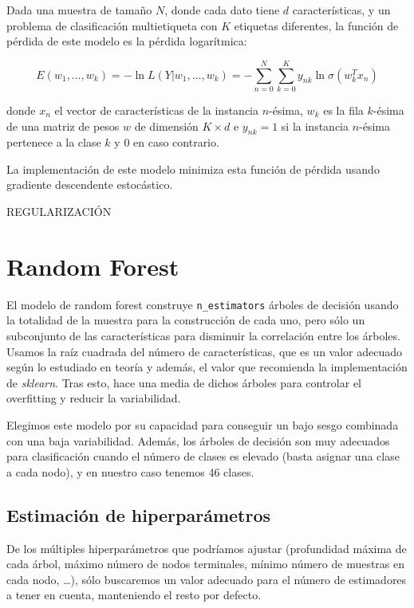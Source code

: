 \documentclass[a4]{article}
\begin{document}
Dada una muestra de tamaño $N$, donde cada dato tiene $d$ características, y un problema de clasificación multietiqueta con $K$ etiquetas diferentes, la función de pérdida de este modelo es la pérdida logarítmica:

\[ E(w_1, \ldots, w_k) = -\ln L(Y|w_1, \ldots, w_k) = -\sum\limits_{n=0}^{N}\sum\limits_{k=0}^{K} y_{nk}\ln \sigma (w^T_kx_n)\]

donde $x_n$ el vector de características de la instancia $n$-ésima, $w_k$ es la fila $k$-ésima de una matriz de pesos $w$ de dimensión $K \times d$ e $y_{nk} = 1$ si la instancia $n$-ésima pertenece a la clase $k$ y $0$ en caso contrario.

La implementación de este modelo minimiza esta función de pérdida usando gradiente descendente estocástico.

REGULARIZACIÓN


\section{Random Forest}

El modelo de random forest construye \texttt{n\_estimators} árboles de
decisión usando la totalidad de la muestra para la construcción de
cada uno, pero sólo un subconjunto de las características para
disminuir la correlación entre los árboles. Usamos la raíz cuadrada
del número de características, que es un valor adecuado según lo
estudiado en teoría y además, el valor que recomienda la
implementación de \textit{sklearn}. Tras esto, hace una media de
dichos árboles para controlar el overfitting y reducir la
variabilidad.

Elegimos este modelo por su capacidad para conseguir un bajo sesgo
combinada con una baja variabilidad. Además, los árboles de decisión
son muy adecuados para clasificación cuando el número de clases es
elevado (basta asignar una clase a cada nodo), y en nuestro caso
tenemos 46 clases.

\subsection{Estimación de hiperparámetros}

De los múltiples hiperparámetros que podríamos ajustar (profundidad
máxima de cada árbol, máximo número de nodos terminales, mínimo número
de muestras en cada nodo, \ldots), sólo buscaremos un valor adecuado
para el número de estimadores a tener en cuenta, manteniendo el resto
por defecto.
\end{document}

